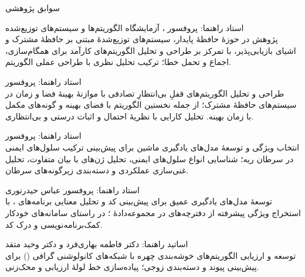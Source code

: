\documentclass[11pt]{article}
\begin{document}
\begin{faSection}{سوابق پژوهشی}

استاد راهنما: پروفسور ، آزمایشگاه الگوریتم‌ها و سیستم‌های توزیع‌شده\\
پژوهش در حوزۀ حافظۀ پایدار، سیستم‌های توزیع‌شدۀ مبتنی بر حافظۀ مشترک و اشیای بازیابی‌پذیر، با تمرکز بر طراحی و تحلیل الگوریتم‌های کارآمد برای همگام‌سازی، اجماع و تحمل خطا؛ ترکیب تحلیل نظری با طراحی عملی الگوریتم.

\vspace{0.5em}
استاد راهنما: پروفسور \\
طراحی و تحلیل الگوریتم‌های قفلِ بی‌انتظارِ تصادفی با موازنۀ بهینۀ فضا و زمان در سیستم‌های حافظۀ مشترک؛ از جمله نخستین الگوریتم با فضای بهینه و گونه‌های مکمل با زمان بهینه. تحلیل کارایی با نظریۀ احتمال و اثبات درستی و بی‌انتظاری.

\vspace{0.5em}
استاد راهنما: پروفسور \\
انتخاب ویژگی و توسعۀ مدل‌های یادگیری ماشین برای پیش‌بینی ترکیب سلول‌های ایمنی در سرطان ریه؛ شناسایی انواع سلول‌های ایمنی، تحلیل ژن‌های با بیان متفاوت، تحلیل غنی‌سازی عملکردی و دسته‌بندی زیرگونه‌های سرطان.

\vspace{0.5em}
استاد راهنما: پروفسور عباس حیدرنوری\\
توسعۀ مدل‌های یادگیری عمیق برای پیش‌بینی کد و تحلیل معنایی برنامه‌های ، با استخراج ویژگی پیشرفته از دفترچه‌های  در مجموعه‌دادۀ ؛ در راستای سامانه‌های خودکار کمک‌برنامه‌نویسی و درک کد.

\vspace{0.5em}
اساتید راهنما: دکتر فاطمه بهاری‌فرد و دکتر وحید متقد\\
توسعه و ارزیابی الگوریتم‌های خوشه‌بندی چهره با شبکه‌های کانولوشنی گرافی () برای پیش‌بینی پیوند و دسته‌بندی زوجی؛ پیاده‌سازی خط لولۀ ارزیابی و محک‌زنی.

\end{faSection}
\end{document}
